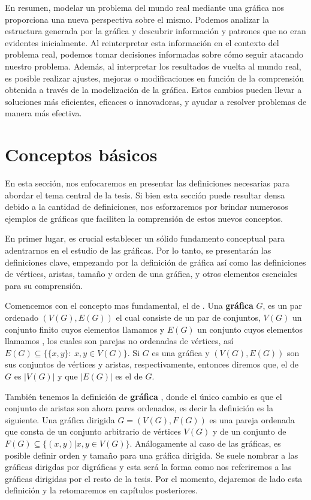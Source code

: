 En resumen, modelar un problema del mundo real mediante una gráfica nos
proporciona una nueva perspectiva sobre el mismo. Podemos analizar la estructura
generada por la gráfica y descubrir información y patrones que no eran evidentes
inicialmente. Al reinterpretar esta información en el contexto del problema
real, podemos tomar decisiones informadas sobre cómo seguir atacando nuestro
problema. Además, al interpretar los resultados de vuelta al mundo real, es
posible realizar ajustes, mejoras o modificaciones en función de la comprensión
obtenida a través de la modelización de la gráfica. Estos cambios pueden llevar
a soluciones más eficientes, eficaces o innovadoras, y ayudar a resolver
problemas de manera más efectiva.


\section{Conceptos básicos}
\label{sec:Cncpts bscs}

En esta sección, nos enfocaremos en presentar las definiciones necesarias para
abordar el tema central de la tesis. Si bien esta sección puede resultar densa
debido a la cantidad de definiciones, nos esforzaremos por brindar numerosos
ejemplos de gráficas que faciliten la comprensión de estos nuevos conceptos.

En primer lugar, es crucial establecer un sólido fundamento conceptual para
adentrarnos en el estudio de las gráficas. Por lo tanto, se presentarán las
definiciones clave, empezando por la definición de gráfica así como las
definiciones de vértices, aristas, tamaño y orden de una gráfica, y otros
elementos esenciales para su comprensión.

Comencemos con el concepto mas fundamental, el de . Una
\textbf{gr\'afica}  $G$, es un par ordenado
$(V(G), E(G))$ el cual consiste de un par de conjuntos, $V(G)$ un conjunto
finito cuyos elementos llamamos  y $E(G)$ un conjunto cuyos
elementos llamamos , los cuales son parejas no ordenadas de
vértices, así $E(G)\subseteq \{ \{x,y\} \colon\ x,y\in V(G) \}$.  Si $G$ es una
gráfica y $(V(G),E(G))$ son sus conjuntos de vértices y aristas,
respectivamente, entonces diremos que, el  de $G$ es $|V(G)|$ y
que $|E(G)|$ es el  de $G$.

También tenemos la definición de \textbf{gr\'afica}
, donde el único cambio es que el conjunto de
aristas son ahora pares ordenados, es decir la definición es la siguiente. Una
gráfica dirigida $G=(V(G),F(G))$ es una pareja ordenada que consta de un
conjunto arbitrario de vértices $V(G)$ y de un conjunto de 
$F(G)\subseteq \{ (x,y) | x,y\in V(G) \}$.   An\'alogamente al caso de las
gr\'aficas, es posible definir orden y tama\~no para una gr\'afica dirigida. Se
suele nombrar a las gráficas dirigdas por digráficas y esta será la forma como
nos referiremos a las gráficas dirigidas por el resto de la tesis. Por el
momento, dejaremos de lado esta definición  y la retomaremos en capítulos
posteriores.


